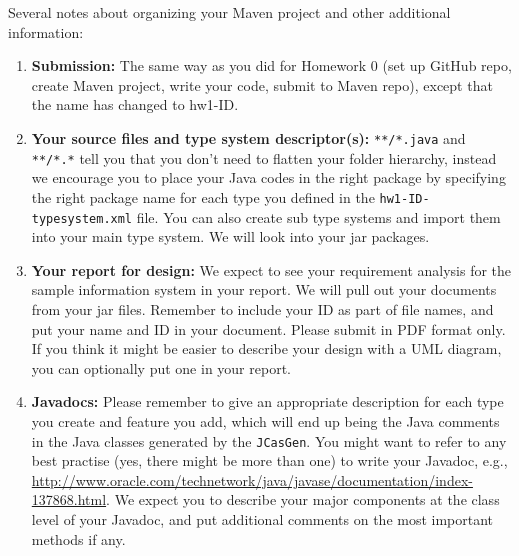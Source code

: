 \documentclass[oneside]{memoir}
\begin{document}
\begin{titlingpage}
\begin{minipage}{1.2\textwidth}
\begin{itemize}
\end{itemize}

\end{minipage}
\hspace{-0.1\textwidth}

\hspace{-0.1\textwidth}
\begin{minipage}{1.2\textwidth}

Several notes about organizing your Maven project and other additional
information:

\begin{enumerate}

\item \textbf{Submission:} The same way as you did for Homework 0 (set up GitHub
repo, create Maven project, write your code, submit to Maven repo), except that
the name has changed to hw1-ID.

\item \textbf{Your source files and type system descriptor(s):} \verb|**/*.java|
and \verb|**/*.*| tell you that you don't need to flatten your folder hierarchy,
instead we encourage you to place your Java codes in the right package by
specifying the right package name for each type you defined in the
\verb|hw1-ID-typesystem.xml| file. You can also create sub type systems and
import them into your main type system. We will look into your jar packages.

\item \textbf{Your report for design:} We expect to see your requirement
analysis for the sample information system in your report. We will pull out your
documents from your jar files. Remember to include your ID as part of file
names, and put your name and ID in your document. Please submit in PDF format
only. If you think it might be easier to describe your design with a UML
diagram, you can optionally put one in your report.

\item \textbf{Javadocs:} Please remember to give an appropriate description for
each type you create and feature you add, which will end up being the Java
comments in the Java classes generated by the \texttt{JCasGen}. You might want
to refer to any best practise (yes, there might be more than one) to write your
Javadoc, e.g.,
\url{http://www.oracle.com/technetwork/java/javase/documentation/index-137868.html}.
We expect you to describe your major components at the class level of your
Javadoc, and put additional comments on the most important methods if any.


\end{enumerate}
\end{minipage}
\end{titlingpage}
\end{document}
